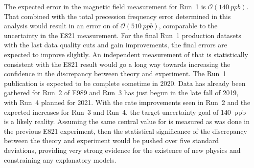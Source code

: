 The expected error in the magnetic field measurement for Run~1 is $\mathcal{O}(\SI{140}{ppb})$. That combined with the total precession frequency error determined in this analysis would result in an error on \amu of $\mathcal{O}(\SI{510}{ppb})$, comparable to the uncertainty in the E821 measurement. For the final Run~1 production datasets with the last data quality cuts and gain improvements, the final errors are expected to improve slightly. An independent measurement of \amu that is statistically consistent with the E821 result would go a long way towards increasing the confidence in the discrepancy between theory and experiment. The Run~1 publication is expected to be complete sometime in 2020. Data has already been gathered for Run~2 of E989 and Run~3 has just begun in the late fall of 2019, with Run~4 planned for 2021. With the rate improvements seen in Run~2 and the expected increases for Run~3 and Run~4, the target uncertainty goal of \SI{140}{ppb} is a likely reality. Assuming the same central value for \amu is measured as was done in the previous E821 experiment, then the statistical significance of the discrepancy between the theory and experiment would be pushed over five standard deviations, providing very strong evidence for the existence of new physics and constraining any explanatory models.







